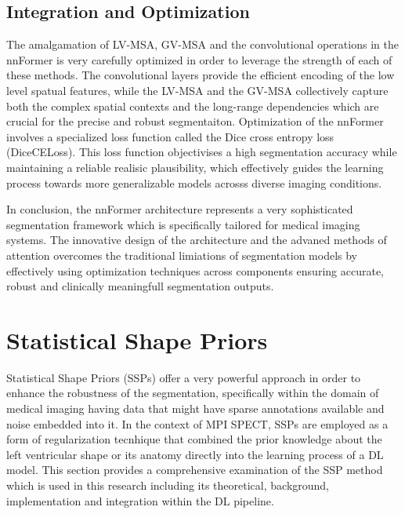 \subsection{Integration and Optimization}
The amalgamation of LV-MSA, GV-MSA and the convolutional operations in the nnFormer is very carefully optimized in order to leverage the strength of each of these methods. The convolutional layers provide the efficient encoding of the low level spatual features, while the LV-MSA and the GV-MSA collectively capture both the complex spatial contexts and the long-range dependencies which are crucial for the precise and robust segmentaiton. Optimization of the nnFormer involves a specialized loss function called the Dice cross entropy loss (DiceCELoss). This loss function objectivises a high segmentation accuracy while maintaining a reliable realisic plausibility, which effectively guides the learning process towards more generalizable models acrosss diverse imaging conditions.


In conclusion, the nnFormer architecture represents a very sophisticated segmentation framework which is specifically tailored for medical imaging systems. The innovative design of the architecture and the advaned methods of attention overcomes the traditional limiations of segmentation models by effectively using optimization techniques across components ensuring accurate, robust and clinically meaningfull segmentation outputs.

\section{Statistical Shape Priors}
Statistical Shape Priors (SSPs) offer a very powerful approach in order to enhance the robustness of the segmentation, specifically within the domain of medical imaging having data that might have sparse annotations available and noise embedded into it. In the context of MPI SPECT, SSPs are employed as a form of regularization tecnhique that combined the prior knowledge about the left ventricular shape or its anatomy directly into the learning process of a DL model. This section provides a comprehensive examination of the SSP method which is used in this research including its theoretical, background, implementation and integration within the DL pipeline.

